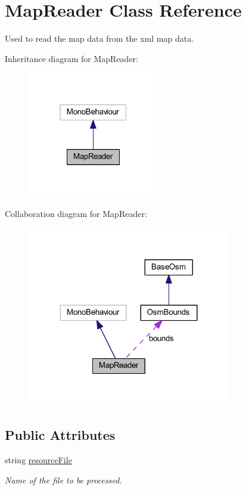 \hypertarget{class_map_reader}{}\section{Map\+Reader Class Reference}
\label{class_map_reader}


Used to read the map data from the xml map data.  




Inheritance diagram for Map\+Reader\+:\nopagebreak
\begin{figure}[H]
\begin{center}
\leavevmode
\includegraphics[width=163pt]{class_map_reader__inherit__graph}
\end{center}
\end{figure}


Collaboration diagram for Map\+Reader\+:\nopagebreak
\begin{figure}[H]
\begin{center}
\leavevmode
\includegraphics[width=252pt]{class_map_reader__coll__graph}
\end{center}
\end{figure}
\subsection*{Public Attributes}
\begin{DoxyCompactItemize}
\item 
string \mbox{\hyperlink{class_map_reader_aff566165f4af74a7e11ea3df1aa4a78e}{resource\+File}}
\begin{DoxyCompactList}\small\item\em Name of the file to be processed. \end{DoxyCompactList}\end{DoxyCompactItemize}
